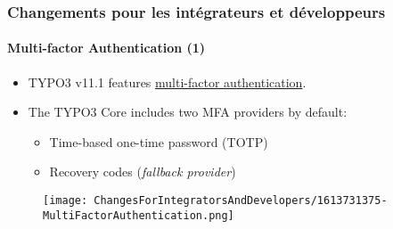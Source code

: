 %

\begin{frame}[fragile]
	\frametitle{Changements pour les intégrateurs et développeurs}
	\framesubtitle{Multi-factor Authentication (1)}


	\begin{itemize}
		\item TYPO3 v11.1 features
			\href{https://en.wikipedia.org/wiki/Multi-factor_authentication}{multi-factor authentication}.
		\item The TYPO3 Core includes two MFA providers by default:

			\begin{itemize}
				\item Time-based one-time password (TOTP)
				\item Recovery codes (\textit{fallback provider})
			\end{itemize}

	\end{itemize}

	\begin{figure}
		\texttt{[image: ChangesForIntegratorsAndDevelopers/1613731375-MultiFactorAuthentication.png]}
	\end{figure}

\end{frame}

